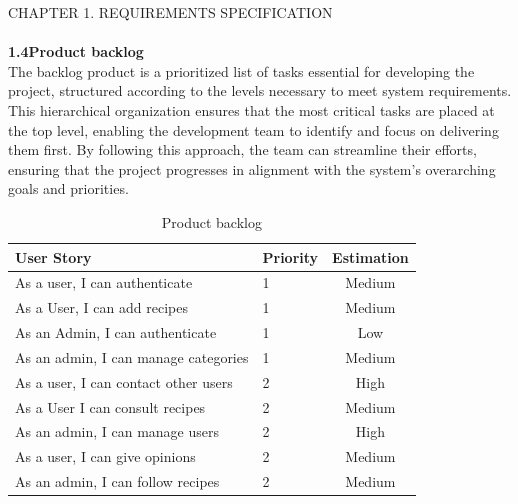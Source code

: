 \documentclass{article}
\begin{document}
\newpage
\noindent
CHAPTER 1.  REQUIREMENTS SPECIFICATION \\
\underline{\hspace{\textwidth}} \vspace{0.2cm}\\
{\Large \textbf{1.4\hspace{1em}Product backlog}}\vspace{0.2cm}
\\The backlog product is a prioritized list of tasks essential for developing the project, structured according to the levels necessary to meet system requirements. This hierarchical organization ensures that the most critical tasks are placed at the top level, enabling the development team to identify and focus on delivering them first. By following this approach, the team can streamline their efforts, ensuring that the project progresses in alignment with the system's overarching goals and priorities.\vspace{0.8cm}
\begin{table}[h]
    \centering
    \begin{tabularx}{\textwidth}{lXc}
        \toprule
        \textbf{\color{blue!70} User Story} & \textbf{\color{blue!70} Priority} & \textbf{\color{blue!70} Estimation} \\ 
        \midrule
        As a user, I can authenticate &\hspace{1em} 1 & Medium \\
        \midrule
        As a User, I can add recipes &\hspace{1em} 1 & Medium \\
        \midrule
        As an Admin, I can authenticate &\hspace{1em} 1 & Low \\
        \midrule
        As an admin, I can manage categories &\hspace{1em} 1 & Medium \\
        \midrule
        As a user, I can contact other users &\hspace{1em} 2 & High \\
        \midrule
 	As a User I can consult recipes &\hspace{1em} 2 & Medium \\
        \midrule
        As an admin, I can manage users &\hspace{1em} 2 & High \\
        \midrule
        As a user, I can give opinions &\hspace{1em} 2 & Medium \\
        \midrule
        As an admin, I can follow recipes &\hspace{1em} 2 & Medium \\
        \bottomrule
    \end{tabularx}
    \caption{Product backlog}
    \label{tab:user_stories}
\end{table}
\end{document}
